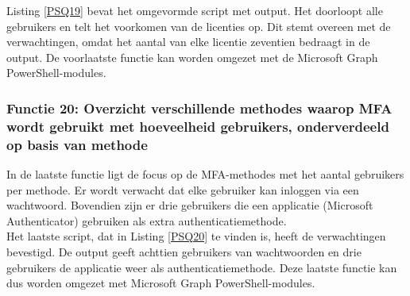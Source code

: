 Listing \ref{PSQ19} bevat het omgevormde script met output. Het doorloopt alle gebruikers en telt het voorkomen van de licenties op. Dit stemt overeen met de verwachtingen, omdat het aantal van elke licentie zeventien bedraagt in de output. De voorlaatste functie kan worden omgezet met de Microsoft Graph PowerShell-modules.

\subsubsection{Functie 20: Overzicht verschillende methodes waarop MFA wordt gebruikt met hoeveelheid gebruikers, onderverdeeld op basis van methode}


In de laatste functie ligt de focus op de \ac{MFA}-methodes met het aantal gebruikers per methode. Er wordt verwacht dat elke gebruiker kan inloggen via een wachtwoord. Bovendien zijn er drie gebruikers die een applicatie (Microsoft Authenticator) gebruiken als extra authenticatiemethode. \\

Het laatste script, dat in Listing \ref{PSQ20} te vinden is, heeft de verwachtingen bevestigd. De output geeft achttien gebruikers van wachtwoorden en drie gebruikers de applicatie weer als authenticatiemethode. Deze laatste functie kan dus worden omgezet met Microsoft Graph PowerShell-modules.